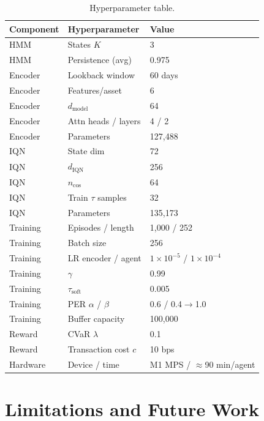 \documentclass[sigconf,nonacm]{acmart}
\begin{document}
\begin{table}[h]
  \caption{Hyperparameter table.}
  \label{tab:hparams}
  \small
  \begin{tabular}{lll}
    \toprule
    Component & Hyperparameter & Value \\
    \midrule
    HMM      & States $K$              & 3 \\
    HMM      & Persistence (avg)       & 0.975 \\
    Encoder  & Lookback window         & 60 days \\
    Encoder  & Features/asset          & 6 \\
    Encoder  & $d_{\text{model}}$      & 64 \\
    Encoder  & Attn heads / layers     & 4 / 2 \\
    Encoder  & Parameters              & 127,488 \\
    IQN      & State dim               & 72 \\
    IQN      & $d_{\text{IQN}}$        & 256 \\
    IQN      & $n_{\cos}$              & 64 \\
    IQN      & Train $\tau$ samples    & 32 \\
    IQN      & Parameters              & 135,173 \\
    Training & Episodes / length       & 1,000 / 252 \\
    Training & Batch size              & 256 \\
    Training & LR encoder / agent      & $1\times10^{-5}$ / $1\times10^{-4}$ \\
    Training & $\gamma$                & 0.99 \\
    Training & $\tau_{\text{soft}}$    & 0.005 \\
    Training & PER $\alpha$ / $\beta$  & 0.6 / 0.4$\to$1.0 \\
    Training & Buffer capacity         & 100,000 \\
    Reward   & CVaR $\lambda$          & 0.1 \\
    Reward   & Transaction cost $c$    & 10 bps \\
    Hardware & Device / time           & M1 MPS / $\approx$90 min/agent \\
    \bottomrule
  \end{tabular}
\end{table}

\section{Limitations and Future Work}
\label{sec:limitations}
\end{document}
